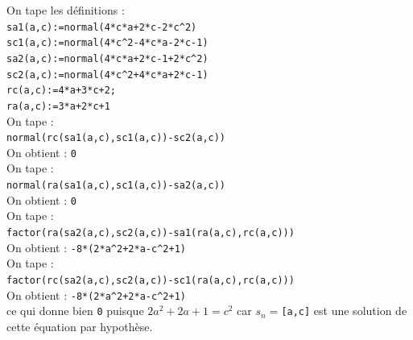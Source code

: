 \documentclass[a4paper,11pt]{book}
\begin{document}
\begin{enumerate}
On tape les d\'efinitions :\\
{\tt sa1(a,c):=normal(4*c*a+2*c-2*c\verb|^|2)}\\
{\tt sc1(a,c):=normal(4*c\verb|^|2-4*c*a-2*c-1)}\\
{\tt sa2(a,c):=normal(4*c*a+2*c-1+2*c\verb|^|2)}\\
{\tt sc2(a,c):=normal(4*c\verb|^|2+4*c*a+2*c-1)}\\
{\tt rc(a,c):=4*a+3*c+2;}\\
{\tt ra(a,c):=3*a+2*c+1}\\
On tape :\\
{\tt normal(rc(sa1(a,c),sc1(a,c))-sc2(a,c))}\\
On obtient : {\tt 0}\\ 
On tape :\\
{\tt normal(ra(sa1(a,c),sc1(a,c))-sa2(a,c))}\\
On obtient : {\tt 0}\\ 
On tape :\\
{\tt factor(ra(sa2(a,c),sc2(a,c))-sa1(ra(a,c),rc(a,c)))}\\
On obtient : {\tt -8*(2*a\verb|^|2+2*a-c\verb|^|2+1)}\\ 
On tape :\\
{\tt factor(rc(sa2(a,c),sc2(a,c))-sc1(ra(a,c),rc(a,c)))}\\
On obtient : {\tt -8*(2*a\verb|^|2+2*a-c\verb|^|2+1)}\\ 
ce qui donne bien {\tt 0} puisque $2a^2+2a+1=c^2$ car $s_n=${\tt [a,c]} est 
une solution de cette \'equation par hypoth\`ese.\\


\end{enumerate}
\end{document}

